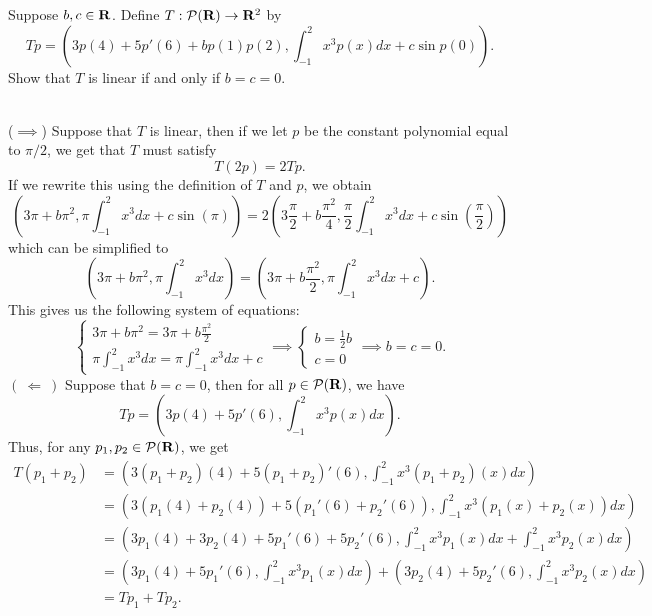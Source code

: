 \begin{exercise}
    Suppose $b,c \in \mathbf{R}$. Define $T : \mathcal{P}(\mathbf{R}) \to \mathbf{R}^2$ by
    $$Tp = \left(3p(4) + 5p'(6) + bp(1)p(2), \int_{-1}^{2}x^3p(x)dx + c \sin p(0) \right).$$
    Show that $T$ is linear if and only if $b = c = 0$. \\
\end{exercise}

\begin{solution}
    \\ ($\implies$) Suppose that $T$ is linear, then if we let $p$ be the constant polynomial equal to $\pi/2$, we get that $T$ must satisfy
    $$T(2p) = 2Tp.$$
    If we rewrite this using the definition of $T$ and $p$, we obtain
    $$\left(3\pi + b\pi^2, \pi\int_{-1}^{2}x^3dx + c\sin(\pi)\right) = 2\left(3\frac{\pi}{2} + b\frac{\pi^2}{4}, \frac{\pi}{2}\int_{-1}^{2}x^3dx + c\sin\left(\frac{\pi}{2}\right)\right)$$
    which can be simplified to
    $$\left(3\pi + b\pi^2, \pi\int_{-1}^{2}x^3dx\right) = \left(3\pi + b\frac{\pi^2}{2}, \pi\int_{-1}^{2}x^3dx + c\right).$$
    This gives us the following system of equations:
    $$\begin{cases}
        3\pi + b\pi^2 = 3\pi + b\frac{\pi^2}{2} \\
        \pi\int_{-1}^{2}x^3dx = \pi\int_{-1}^{2}x^3dx + c
    \end{cases} 
    \implies
    \begin{cases}
        b = \frac{1}{2}b \\
        c = 0
    \end{cases}
    \implies b = c = 0.$$
    $( \ \Longleftarrow \ )$ Suppose that $b = c = 0$, then for all $p \in \mathcal{P}(\mathbf{R})$, we have
    $$Tp = \left(3p(4) + 5p'(6), \int_{-1}^{2}x^3p(x)dx \right).$$
    Thus, for any $p_1, p_2 \in \mathcal{P}(\mathbf{R})$, we get 
    \begin{align*}
        T(p_1 + p_2) &= \left(3(p_1 + p_2)(4) + 5(p_1 + p_2)'(6), \int_{-1}^{2}x^3(p_1 + p_2)(x)dx \right) \\
        &= \left(3(p_1(4) + p_2(4)) + 5(p_1'(6) + p_2'(6)), \int_{-1}^{2}x^3(p_1(x) + p_2(x))dx \right) \\
        &= \left(3p_1(4) + 3p_2(4) + 5p_1'(6) + 5p_2'(6), \int_{-1}^{2}x^3p_1(x)dx + \int_{-1}^{2}x^3p_2(x)dx \right) \\
        &= \left(3p_1(4) + 5p_1'(6), \int_{-1}^{2}x^3p_1(x)dx \right) + \left(3p_2(4) + 5p_2'(6), \int_{-1}^{2}x^3p_2(x)dx \right) \\
        &= Tp_1 + Tp_2.
    \end{align*}

\end{solution}
